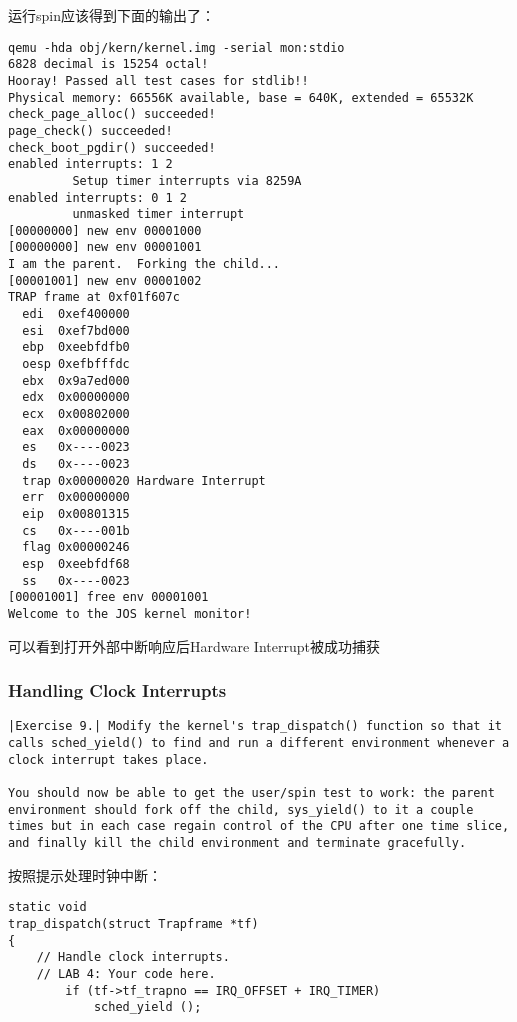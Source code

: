 \documentclass{article}
\begin{document}
\begin{CJK*}{UTF8}{gkai}
运行spin应该得到下面的输出了：

\begin{lstlisting}[style=console]
qemu -hda obj/kern/kernel.img -serial mon:stdio
6828 decimal is 15254 octal!
Hooray! Passed all test cases for stdlib!!
Physical memory: 66556K available, base = 640K, extended = 65532K
check_page_alloc() succeeded!
page_check() succeeded!
check_boot_pgdir() succeeded!
enabled interrupts: 1 2
	     Setup timer interrupts via 8259A
enabled interrupts: 0 1 2
	     unmasked timer interrupt
[00000000] new env 00001000
[00000000] new env 00001001
I am the parent.  Forking the child...
[00001001] new env 00001002
TRAP frame at 0xf01f607c
  edi  0xef400000
  esi  0xef7bd000
  ebp  0xeebfdfb0
  oesp 0xefbfffdc
  ebx  0x9a7ed000
  edx  0x00000000
  ecx  0x00802000
  eax  0x00000000
  es   0x----0023
  ds   0x----0023
  trap 0x00000020 Hardware Interrupt
  err  0x00000000
  eip  0x00801315
  cs   0x----001b
  flag 0x00000246
  esp  0xeebfdf68
  ss   0x----0023
[00001001] free env 00001001
Welcome to the JOS kernel monitor!
\end{lstlisting}

可以看到打开外部中断响应后Hardware Interrupt被成功捕获


\subsubsection{Handling Clock Interrupts}


\begin{lstlisting}[style=exercise]
|Exercise 9.| Modify the kernel's trap_dispatch() function so that it calls sched_yield() to find and run a different environment whenever a clock interrupt takes place.

You should now be able to get the user/spin test to work: the parent environment should fork off the child, sys_yield() to it a couple times but in each case regain control of the CPU after one time slice, and finally kill the child environment and terminate gracefully.
\end{lstlisting}

按照提示处理时钟中断：

\begin{lstlisting}[style=ccode, title={\scriptsize \ttfamily \bfseries kern/trap.c: trap\_dispatch()}]
static void
trap_dispatch(struct Trapframe *tf)
{
	// Handle clock interrupts.
	// LAB 4: Your code here.
        if (tf->tf_trapno == IRQ_OFFSET + IRQ_TIMER)
            sched_yield ();
\end{lstlisting}


\end{CJK*}
\end{document}
